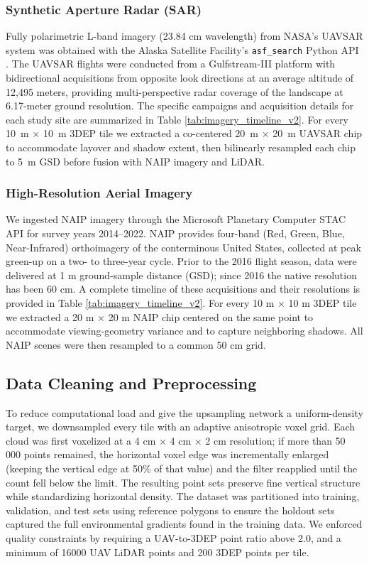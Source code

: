 \documentclass[preprints,article,accept,pdftex,moreauthors]{Definitions/mdpi}
\begin{document}
\subsubsection{Synthetic Aperture Radar (SAR)}
Fully polarimetric L-band imagery (23.84 cm wavelength) from NASA’s UAVSAR system was obtained with the Alaska Satellite Facility’s \texttt{asf\_search} Python API \citep{alaska_search}.  The UAVSAR flights were conducted from a Gulfstream-III platform with bidirectional acquisitions from opposite look directions at an average altitude of 12,495 meters, providing multi-perspective radar coverage of the landscape at 6.17-meter ground resolution. The specific campaigns and acquisition details for each study site are summarized in Table \ref{tab:imagery_timeline_v2}. For every \SI{10}{m} × \SI{10}{m} 3DEP tile we extracted a co-centered \SI{20}{m} × \SI{20}{m} UAVSAR chip to accommodate layover and shadow extent, then bilinearly resampled each chip to \SI{5}{m} GSD before fusion with NAIP imagery and LiDAR. 


\subsubsection{High-Resolution Aerial Imagery}
We ingested NAIP imagery through the Microsoft Planetary Computer STAC API \citep{planetary_computer} for survey years 2014–2022.  
NAIP provides four-band (Red, Green, Blue, Near-Infrared) orthoimagery of the conterminous United States, collected at peak green-up on a two- to three-year cycle.  Prior to the 2016 flight season, data were delivered at 1 m ground-sample distance (GSD); since 2016 the native resolution has been 60 cm. A complete timeline of these acquisitions and their resolutions is provided in Table \ref{tab:imagery_timeline_v2}. For every 10 m × 10 m 3DEP tile we extracted a 20 m × 20 m NAIP chip centered on the same point to accommodate viewing-geometry variance and to capture neighboring shadows.  All NAIP scenes were then resampled to a common 50 cm grid.



\subsection{Data Cleaning and Preprocessing}
To reduce computational load and give the upsampling network a uniform-density target, we downsampled every tile with an adaptive anisotropic voxel grid. Each cloud was first voxelized at a 4 cm × 4 cm × 2 cm resolution; if more than 50 000 points remained, the horizontal voxel edge was incrementally enlarged (keeping the vertical edge at 50\% of that value) and the filter reapplied until the count fell below the limit. The resulting point sets preserve fine vertical structure while standardizing horizontal density. The dataset was partitioned into training, validation, and test sets using reference polygons to ensure the holdout sets captured the full environmental gradients found in the training data. We enforced quality constraints by requiring a UAV-to-3DEP point ratio above 2.0, and a minimum of 16000 UAV LiDAR points and 200 3DEP points per tile.
\end{document}
